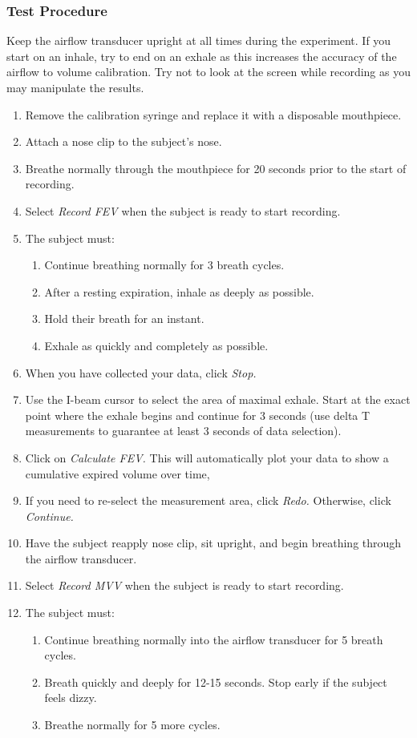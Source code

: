 \documentclass{article}
\begin{document}
\subsubsection*{Test Procedure}
\begin{info}
	Keep the airflow transducer upright at all times during the experiment. If you start on an inhale, try to end on an exhale as this increases the accuracy of the airflow to volume calibration. Try not to look at the screen while recording as you may manipulate the results.
\end{info}
\begin{enumerate}
	\item Remove the calibration syringe and replace it with a disposable mouthpiece.
	\item Attach a nose clip to the subject's nose.
	\item Breathe normally through the mouthpiece for 20 seconds prior to the start of recording.
	\item Select \textit{Record FEV} when the subject is ready to start recording.
	\item The subject must:\begin{enumerate}
		\item Continue breathing normally for 3 breath cycles.
		\item After a resting expiration, inhale as deeply as possible.
		\item Hold their breath for an instant.
		\item Exhale as quickly and completely as possible.
	\end{enumerate}

	\item When you have collected your data, click \textit{Stop.}
	\item Use the I-beam cursor to select the area of maximal exhale. Start at the exact point where the exhale begins and continue for 3 seconds (use delta T measurements to guarantee at least 3 seconds of data selection).
	\item Click on \textit{Calculate FEV.} This will automatically plot your data to show a cumulative expired volume over time,
	\item If you need to re-select the measurement area, click \textit{Redo.} Otherwise, click \textit{Continue.}
	\item Have the subject reapply nose clip, sit upright, and begin breathing through the airflow transducer.
	\item Select \textit{Record MVV} when the subject is ready to start recording.
	\item The subject must:\begin{enumerate}
		\item Continue breathing normally into the airflow transducer for 5 breath cycles.
		\item Breath quickly and deeply for 12-15 seconds. Stop early if the subject feels dizzy.
		\item Breathe normally for 5 more cycles.
	\end{enumerate}
	

\end{enumerate}
\end{document}
